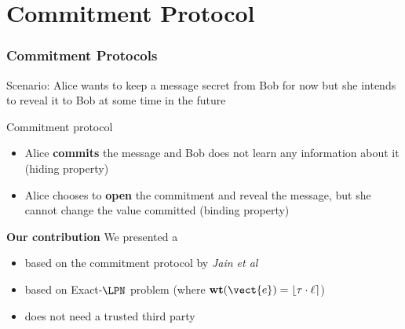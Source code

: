 
\section{Commitment Protocol}

\begin{frame}
\frametitle{Commitment Protocols}

\begin{block}{Scenario:}
 Alice wants to keep a message secret from Bob for now but she intends to reveal it to Bob at some time in the future
\end{block}

 \begin{block}{Commitment protocol}
  \begin{itemize}
   \item<3-> Alice \textbf{commits} the message and Bob does not learn any information about it (\alert{hiding} property)
   \item<4-> Alice chooses to \textbf{open} the commitment and reveal the message, but she cannot change the value committed (\alert{binding} property)
  \end{itemize}
 \end{block}

\begin{block}{\textbf{Our contribution}}
 We presented a {\color{red}{Commitment protocol}}
 \begin{itemize}
  \item<6-> based on the commitment protocol by \textit{Jain et al}
  \item<7-> based on Exact-$\LPN$ problem (where $\mathbf{wt}(\vect{e})=\lfloor \tau \cdot \ell \rceil$)
  \item<8-> does not need a trusted third party
 \end{itemize}
\end{block}


\end{frame}



